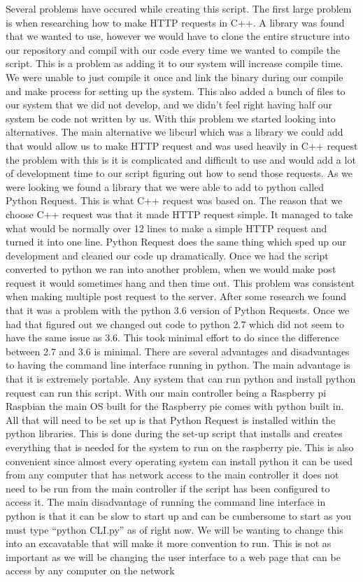 \documentclass[onecolumn, draftclsnofoot,10pt, compsoc]{IEEEtran}
\begin{document}
Several problems have occured while creating this script. The first large problem is when researching how to make HTTP requests in C++. A library was found that we wanted to use, however we would have to clone the entire structure into our repository and compil with our code every time we wanted to compile the script. This is a problem as adding it to our system will increase compile time. We were unable to just compile it once and link the binary during our compile and make process for setting up the system.  This also added a bunch of files to our system that we did not develop, and we didn’t feel right having half our system be code not written by us. With this problem we started looking into alternatives. The main alternative we libcurl which was a library we could add that would allow us to make HTTP request and was used heavily in C++ request the problem with this is it is complicated and difficult to use and would add a lot of development time to our script figuring out how to send those requests. As we were looking we found a library that we were able to add to python called Python Request. This is what C++ request was based on.  The reason that we choose C++ request was that it made HTTP request simple. It managed to take what would be normally over 12 lines to make a simple HTTP request and turned it into one line. Python Request does the same thing which sped up our development and cleaned our code up dramatically.
Once we had the script converted to python we ran into another problem, when we would make post request it would sometimes hang and then time out. This problem was consistent when making multiple post request to the server. After some research we found that it was a problem with the python 3.6 version of Python Requests.  Once we had that figured out we changed out code to python 2.7 which did not seem to have the same issue as 3.6. This took minimal effort to do since the difference between 2.7 and 3.6 is minimal.
There are several advantages and disadvantages to having the command line interface running in python. The main advantage is that it is extremely portable. Any system that can run python and install python request can run this script. With our main controller being a Raspberry pi Raspbian the main OS built for the Raspberry pie comes with python built in. All that will need to be set up is that Python Request is installed within the python libraries. This is done during the set-up script that installs and creates everything that is needed for the system to run on the raspberry pie. This is also convenient since almost every operating system can install python it can be used from any computer that has network access to the main controller it does not need to be run from the main controller if the script has been configured to access it.
The main disadvantage of running the command line interface in python is that it can be slow to start up and can be cumbersome to start as you must type “python CLI.py” as of right now. We will be wanting to change this into an excavatable that will make it more convention to run.  This is not as important as we will be changing the user interface to a web page that can be access by any computer on the network
\end{document}
